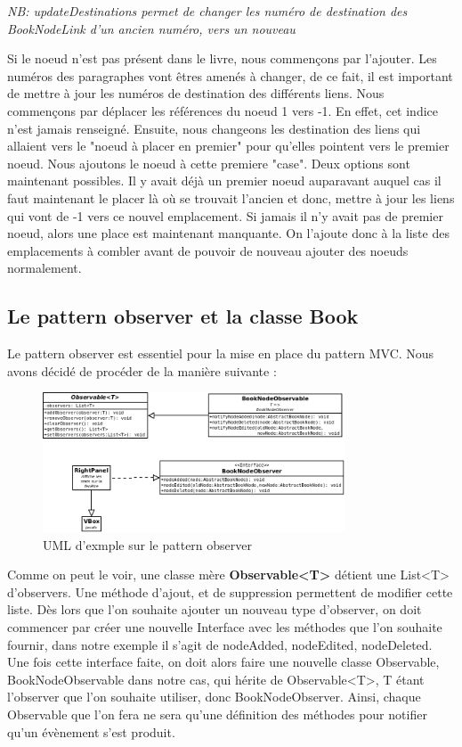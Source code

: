 			\textit{NB: updateDestinations permet de changer les numéro de destination des BookNodeLink d'un ancien numéro, vers un nouveau}

			Si le noeud n'est pas présent dans le livre, nous commençons par l'ajouter. Les numéros des paragraphes vont êtres amenés à changer, de ce fait, il est important de mettre à jour les numéros de destination des différents liens. Nous commençons par déplacer les références du noeud 1 vers -1. En effet, cet indice n'est jamais renseigné. Ensuite, nous changeons les destination des liens qui allaient vers le "noeud à placer en premier" pour qu'elles pointent vers le premier noeud. Nous ajoutons le noeud à cette premiere "case". Deux options sont maintenant possibles. Il y avait déjà un premier noeud auparavant auquel cas il faut maintenant le placer là où se trouvait l'ancien et donc, mettre à jour les liens qui vont de -1 vers ce nouvel emplacement. Si jamais il n'y avait pas de premier noeud, alors une place est maintenant manquante. On l'ajoute donc à la liste des emplacements à combler avant de pouvoir de nouveau ajouter des noeuds normalement.

		\subsection{Le pattern observer et la classe Book}
			\label{subsec:pattern_observer}

			Le pattern observer est essentiel pour la mise en place du pattern MVC. Nous avons décidé de procéder de la manière suivante :

			\begin{figure}[H]
				\centering\includegraphics[width=0.8\textwidth, keepaspectratio]{img/observer.png}
				\caption{UML d'exmple sur le pattern observer}
			\end{figure}

			Comme on peut le voir, une classe mère \textbf{Observable<T>} détient une List<T> d'observers. Une méthode d'ajout, et de suppression permettent de modifier cette liste. Dès lors que l'on souhaite ajouter un nouveau type d'observer, on doit commencer par créer une nouvelle Interface avec les méthodes que l'on souhaite fournir, dans notre exemple il s'agit de nodeAdded, nodeEdited, nodeDeleted. Une fois cette interface faite, on doit alors faire une nouvelle classe Observable, BookNodeObservable dans notre cas, qui hérite de Observable<T>, T étant l'observer que l'on souhaite utiliser, donc BookNodeObserver. Ainsi, chaque Observable que l'on fera ne sera qu'une définition des méthodes pour notifier qu'un évènement s'est produit.

